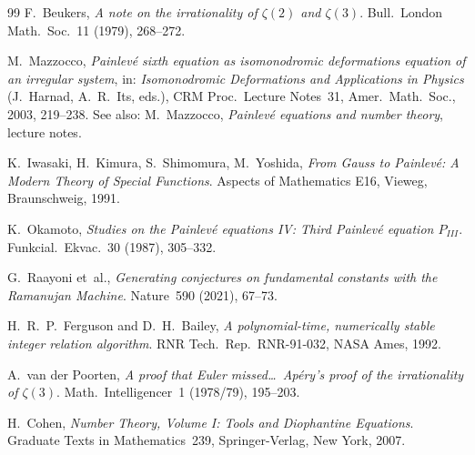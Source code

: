 \documentclass[11pt,a4paper]{article}
\theoremstyle{definition}
\theoremstyle{remark}
\begin{document}
\begin{thebibliography}{99}
F.~Beukers, \emph{A note on the irrationality of $\zeta(2)$ and
$\zeta(3)$}. Bull.~London Math.~Soc.~11 (1979), 268--272.

M.~Mazzocco, \emph{Painlev\'e sixth equation as isomonodromic deformations
equation of an irregular system}, in: \emph{Isomonodromic Deformations and
Applications in Physics} (J.~Harnad, A.~R.~Its, eds.),
CRM Proc.~Lecture Notes~31, Amer.~Math.~Soc., 2003, 219--238.
See also: M.~Mazzocco, \emph{Painlev\'e equations and number theory},
lecture notes.

K.~Iwasaki, H.~Kimura, S.~Shimomura, M.~Yoshida,
\emph{From Gauss to Painlev\'e: A Modern Theory of Special Functions}.
Aspects of Mathematics E16, Vieweg, Braunschweig, 1991.

K.~Okamoto, \emph{Studies on the Painlev\'e equations IV: Third
Painlev\'e equation $P_{III}$}. Funkcial.~Ekvac.~30 (1987), 305--332.

G.~Raayoni et~al., \emph{Generating conjectures on fundamental constants
with the Ramanujan Machine}.
Nature~590 (2021), 67--73.

H.~R.~P.~Ferguson and D.~H.~Bailey, \emph{A polynomial-time, numerically
stable integer relation algorithm}. RNR Tech.\ Rep.\ RNR-91-032, NASA
Ames, 1992.

A.~van der Poorten, \emph{A proof that Euler missed\ldots\ Ap\'ery's proof
of the irrationality of $\zeta(3)$}. Math.~Intelligencer~1 (1978/79),
195--203.

H.~Cohen, \emph{Number Theory, Volume I: Tools and Diophantine
Equations}. Graduate Texts in Mathematics~239, Springer-Verlag, New
York, 2007.

\end{thebibliography}
\end{document}
